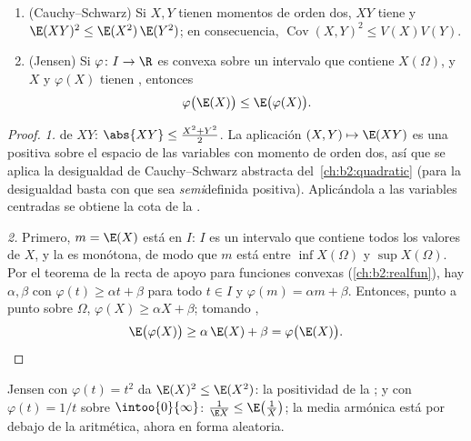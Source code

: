 \begin{theorem}\label{thm:b2:randomvar:jensen}
\leavevmode
\begin{enumerate}
\item (Cauchy--Schwarz) Si $X, Y$ tienen momentos de orden dos, $XY$
tiene  y $\E(XY)^2 \leq \E(X^2)\,\E(Y^2)$; en
consecuencia, $\operatorname{Cov}(X,Y)^2 \leq V(X)V(Y)$.
\item (Jensen) Si $\varphi \colon I \to \R$ es convexa sobre un
intervalo que contiene $X(\Omega)$, y $X$ y $\varphi(X)$ tienen
, entonces
\[
\varphi\bigl(\E(X)\bigr) \leq \E\bigl(\varphi(X)\bigr) .
\]
\end{enumerate}
\end{theorem}

\begin{proof}
\emph{1.}  de $XY$: $\abs{XY} \leq \frac{X^2 + Y^2}2$. La
aplicación $(X, Y) \mapsto \E(XY)$ es una
 positiva sobre el espacio de las variables
con momento de orden dos, así que se aplica la desigualdad de
Cauchy--Schwarz abstracta del~\cref{ch:b2:quadratic} (para la
desigualdad basta con que sea \emph{semi}definida positiva).
Aplicándola a las variables centradas se obtiene la cota de la
.

\emph{2.} Primero, $m = \E(X)$ está en $I$: $I$ es un intervalo que
contiene todos los valores de $X$, y la  es monótona, de
modo que $m$ está entre $\inf X(\Omega)$ y $\sup X(\Omega)$. Por el
teorema de la recta de apoyo para funciones convexas
(\cref{ch:b2:realfun}), hay $\alpha, \beta$ con $\varphi(t) \geq
\alpha t + \beta$ para todo $t \in I$ y $\varphi(m) = \alpha m +
\beta$. Entonces, punto a punto sobre $\Omega$, $\varphi(X) \geq
\alpha X + \beta$; tomando ,
\[
\E\bigl(\varphi(X)\bigr) \geq \alpha\,\E(X) + \beta
= \varphi\bigl(\E(X)\bigr). \qedhere
\]
\end{proof}

\begin{example}
Jensen con $\varphi(t) = t^2$ da $\E(X)^2 \leq \E(X^2)$: la
positividad de la ; y con $\varphi(t) = 1/t$ sobre
$\intoo{0}{\infty}$: $\frac{1}{\E X} \leq \E\bigl(\frac1X\bigr)$; la
media armónica está por debajo de la aritmética, ahora en forma
aleatoria.
\end{example}

